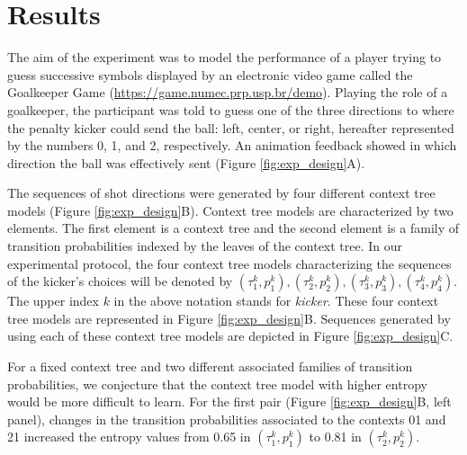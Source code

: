 \documentclass[fleqn,10pt]{wlscirep}
\begin{document}
\section*{Results}

The aim of the experiment was to model the performance of a player trying to guess successive symbols displayed by an electronic video game called the Goalkeeper Game (\url{https://game.numec.prp.usp.br/demo}). Playing the role of a goalkeeper, the participant was told to guess one of the three directions to where the penalty kicker could send the ball: left, center, or right, hereafter represented by the numbers 0, 1, and 2, respectively. An animation feedback showed in which direction the ball was effectively sent (Figure \ref{fig:exp_design}A). 

The sequences of shot directions were generated by four different context tree models (Figure \ref{fig:exp_design}B). Context tree models are characterized by two elements. The first element is a context tree and the second element is a family of transition probabilities indexed by the leaves of the context tree. In our experimental protocol, the four context tree models characterizing the sequences of the kicker's choices will be denoted by $(\tau^k_1, p^k_1),(\tau^k_2, p^k_2),(\tau^k_3, p^k_3), (\tau^k_4, p^k_4)$. The upper index $k$ in the above notation stands for \textit{kicker}. These four context tree models are represented in Figure \ref{fig:exp_design}B. Sequences generated by using each of these context tree models are depicted in Figure \ref{fig:exp_design}C. %

For a fixed context tree and two different associated families of transition probabilities, we conjecture that the context tree model with higher entropy would be more difficult to learn. For the first pair (Figure \ref{fig:exp_design}B, left panel), changes in the transition probabilities associated to the contexts 01 and 21 increased the entropy values from 0.65 in $(\tau^k_1, p^k_1)$ to 0.81 in $(\tau^k_2, p^k_2)$.
\end{document}
